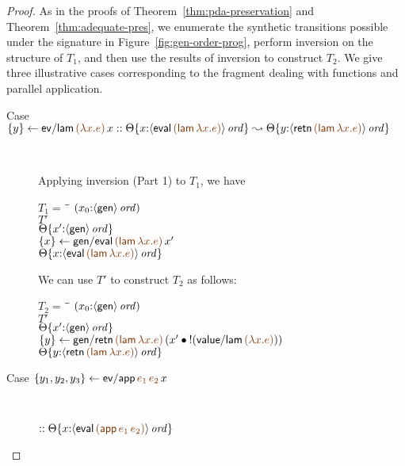 \begin{proof} As in the proofs of Theorem~\ref{thm:pda-preservation}
  and Theorem~\ref{thm:adequate-pres}, we enumerate the synthetic
  transitions possible under the signature in
  Figure~\ref{fig:gen-order-prog}, perform inversion on the structure
  of $T_1$, and then use the results of inversion to construct
  $T_2$. We give three illustrative cases corresponding to the
  fragment dealing with functions and parallel application.

\begin{description}
\item 
  [Case $\trstep{y}{{\sf ev/lam}\,\lf{(\lambda x. e)}\,x}
   ::
   \tackon{\Theta}
     {x{:}\istrue{\susp{{\sf eval}\,\lf{({\sf lam}\,\lambda x.e)}}}}
   \leadsto
   \tackon{\Theta}
     {y{:}\istrue{\susp{{\sf retn}\,\lf{({\sf lam}\,\lambda x.e)}}}}$]~

\medskip
Applying inversion (Part 1) to $T_1$, we have 

\begin{tabbing}
$T_1 = ~$ \= \qquad \= $(x_0{:}{\langle {\sf gen} \rangle}\,{{\it ord}})$
\\
\>$T'$
\\
\>\>${\Theta}\{{x'{:}{\langle {\sf gen} \rangle}\,{{\it ord}}}\}$
\\
\>$\trstep{x}{{\sf gen/eval}\,\lf{({\sf lam}\,\lambda x.e)}\,x'}$
\\
\>\>$\tackon{\Theta}
       {x{:}\istrue{\susp{{\sf eval}\,\lf{({\sf lam}\,\lambda x.e)}}}}$
\end{tabbing}

We can use $T'$ to construct $T_2$ as follows:

\begin{tabbing}
$T_2 = ~$ \= \qquad \= $(x_0{:}{\langle {\sf gen} \rangle}\,{{\it ord}})$
\\
\>$T'$
\\
\>\>${\Theta}\{{x'{:}{\langle {\sf gen} \rangle}\,{{\it ord}}}\}$
\\
\>$\trstep{y}{{\sf gen/retn}\,\lf{({\sf lam}\,\lambda x.e)}\,(\tfuser{x'}{\tbangr{({\sf value/lam}\,\lf{(\lambda x.e)})}})}$
\\
\>\>$\tackon{\Theta}
     {y{:}\istrue{\susp{{\sf retn}\,\lf{({\sf lam}\,\lambda x.e)}}}}$
\end{tabbing}

\item 
  [Case $\trstep{y_1, y_2, y_3}{{\sf ev/app}\,\lf{e_1}\,\lf{e_2}\,x}$]~

\qquad
  $::
   \tackon{\Theta}
     {x{:}\istrue{\susp{{\sf eval}\,\lf{({\sf app}\,e_1\,e_2)}}}}$


\end{description}
\end{proof}
